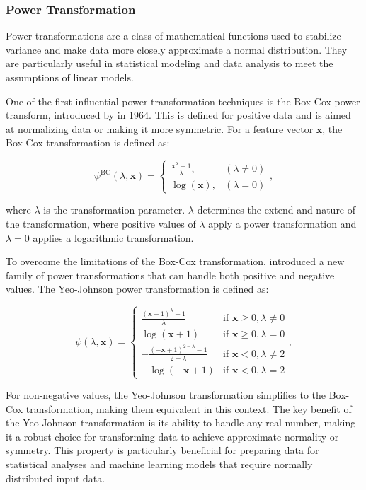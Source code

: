 \subsubsection{Power Transformation}
Power transformations are a class of mathematical functions used to stabilize variance and make data more closely approximate a normal distribution.
They are particularly useful in statistical modeling and data analysis to meet the assumptions of linear models.

One of the first influential power transformation techniques is the Box-Cox power transform, introduced by \citet{BoxAndCox} in 1964.
This is defined for positive data and is aimed at normalizing data or making it more symmetric.
For a feature vector $\mathbf{x}$, the Box-Cox transformation is defined as:

$$
\psi^{\text{BC}}(\lambda, \mathbf{x}) =
\begin{cases}
\frac{\mathbf{x}^\lambda - 1}{\lambda}, & (\lambda \neq 0) \\
\log(\mathbf{x}), & (\lambda = 0)
\end{cases},
$$

where $\lambda$ is the transformation parameter.
$\lambda$ determines the extend and nature of the transformation, where positive values of $\lambda$ apply a power transformation and $\lambda = 0$ applies a logarithmic transformation.

To overcome the limitations of the Box-Cox transformation, \citet{YeoJohnson} introduced a new family of power transformations that can handle both positive and negative values.
The Yeo-Johnson power transformation is defined as:

$$
\psi(\lambda, \mathbf{x}) =
\begin{cases}
\frac{(\mathbf{x} + 1)^\lambda - 1}{\lambda} & \text{if } \mathbf{x} \geq 0, \lambda \neq 0 \\
\log(\mathbf{x} + 1) & \text{if } \mathbf{x} \geq 0, \lambda = 0 \\
- \frac{(-\mathbf{x} + 1)^{2 - \lambda} - 1}{2 - \lambda} & \text{if } \mathbf{x} < 0, \lambda \neq 2 \\
-\log(-\mathbf{x} + 1) & \text{if } \mathbf{x} < 0, \lambda = 2
\end{cases},
$$

For non-negative values, the Yeo-Johnson transformation simplifies to the Box-Cox transformation, making them equivalent in this context.
The key benefit of the Yeo-Johnson transformation is its ability to handle any real number, making it a robust choice for transforming data to achieve approximate normality or symmetry.
This property is particularly beneficial for preparing data for statistical analyses and machine learning models that require normally distributed input data.